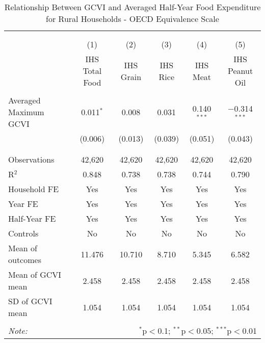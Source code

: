 
\begin{table}[!htbp] \centering 
  \caption{Relationship Between GCVI and Averaged Half-Year Food Expenditure for Rural Households - OECD Equivalence Scale} 
  \label{gcvi_table_4_rural.tex} 
\normalsize 
\begin{tabular}{@{\extracolsep{5pt}}lccccc} 
\\[-1.8ex]\hline 
\hline \\[-1.8ex] 
\\[-1.8ex] & (1) & (2) & (3) & (4) & (5)\\ 
 & IHS Total Food & IHS Grain & IHS Rice & IHS Meat & IHS Peanut Oil \\ 
\hline \\[-1.8ex] 
 Averaged Maximum GCVI & 0.011$^{*}$ & 0.008 & 0.031 & 0.140$^{***}$ & $-$0.314$^{***}$ \\ 
  & (0.006) & (0.013) & (0.039) & (0.051) & (0.043) \\ 
  & & & & & \\ 
\hline \\[-1.8ex] 
Observations & 42,620 & 42,620 & 42,620 & 42,620 & 42,620 \\ 
R$^{2}$ & 0.848 & 0.738 & 0.738 & 0.744 & 0.790 \\ 
Household FE & Yes & Yes & Yes & Yes & Yes \\ 
Year FE & Yes & Yes & Yes & Yes & Yes \\ 
Half-Year FE & Yes & Yes & Yes & Yes & Yes \\ 
Controls & No & No & No & No & No \\ 
Mean of outcomes & 11.476 & 10.710 & 8.710 & 5.345 & 6.582 \\ 
Mean of GCVI mean & 2.458 & 2.458 & 2.458 & 2.458 & 2.458 \\ 
SD of GCVI mean & 1.054 & 1.054 & 1.054 & 1.054 & 1.054 \\ 
\hline \\[-1.8ex] 
\textit{Note:}  & \multicolumn{5}{r}{$^{*}$p$<$0.1; $^{**}$p$<$0.05; $^{***}$p$<$0.01} \\ 
\end{tabular} 
\end{table} 
